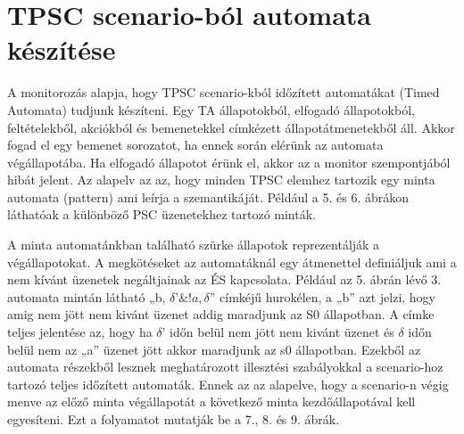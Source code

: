 \chapter{TPSC scenario-ból automata készítése}

A monitorozás alapja, hogy TPSC scenario-kból időzített automatákat (Timed Automata) tudjunk készíteni. Egy TA állapotokból, elfogadó állapotokból, feltételekből, akciókból és bemenetekkel címkézett állapotátmenetekből áll. Akkor fogad el egy bemenet sorozatot, ha ennek során elérünk az automata végállapotába. Ha elfogadó állapotot érünk el, akkor az a monitor szempontjából hibát jelent. Az alapelv az az, hogy minden TPSC elemhez tartozik egy minta automata (pattern) ami leírja a szemantikáját. Például a 5. és 6. ábrákon láthatóak a különböző PSC üzenetekhez tartozó minták.

A minta automatánkban található szürke állapotok reprezentálják a végállapotokat. A megkötéseket az automatáknál egy átmenettel definiáljuk ami a nem kívánt üzenetek negáltjainak az ÉS kapcsolata. Például az 5. ábrán lévő 3. automata mintán látható „b, $\delta ’\&!a, \delta$” címkéjű hurokélen, a „b” azt jelzi, hogy amig nem jött nem kivánt üzenet addig maradjunk az S0 állapotban. A címke teljes jelentése az, hogy ha $\delta$’ időn belül nem jött nem kivánt üzenet és $\delta$ időn belül nem az „a” üzenet jött akkor maradjunk az s0 állapotban. Ezekből az automata részekből lesznek meghatározott illesztési szabályokkal a scenario-hoz tartozó teljes időzített automaták. Ennek az az alapelve, hogy a scenario-n végig menve az előző minta végállapotát a következő minta kezdőállapotával kell egyesíteni. Ezt a folyamatot mutatják be a 7., 8. és 9. ábrák.

